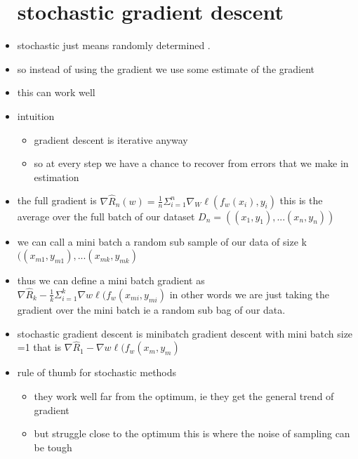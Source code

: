 \documentclass{article}
\begin{document}
\begin{itemize}
\section{stochastic gradient descent}
\item stochastic just means randomly determined .
\item so instead of using the gradient we use some estimate of the gradient 
\item this can work well
\item intuition 
\begin{itemize}
    \item gradient descent is iterative anyway 
    \item so at every step we have a chance to recover from errors that we make in estimation 
\end{itemize}
\item the full gradient is $\nabla \hat{R}_{n}(w)=\frac{1}{n}\Sigma_{i=1}^{n}\nabla_{W}\ell(f_{w}(x_i),y_i)$ this is the average over the full batch of our dataset $D_{n}=((x_1,y_1),...(x_n,y_n))$
\item we can call a mini batch a random sub sample of our data of size k $((x_{m1},y_{m1}),...(x_{mk}, y_{mk})$
\item thus we can define a mini batch gradient as $\nabla\hat{R}_{k}-\frac{1}{k}\Sigma_{i=1}^{k}\nabla w \ell(f_{w}(x_{mi}, y_{mi})$ in other words we are just taking the gradient over the mini batch ie a random sub bag of our data.
\item stochastic gradient descent is minibatch gradient descent with mini batch size =1 that is $\nabla\hat{R}_{1}-\nabla w \ell(f_{w}(x_{m}, y_{m})$
\item rule of thumb for stochastic methods 
\begin{itemize}
    \item they work well far from the optimum, ie they get the general trend of gradient 
    \item but struggle close to the optimum this is where the noise of sampling can be tough 
\end{itemize}

\end{itemize}
\end{document}
